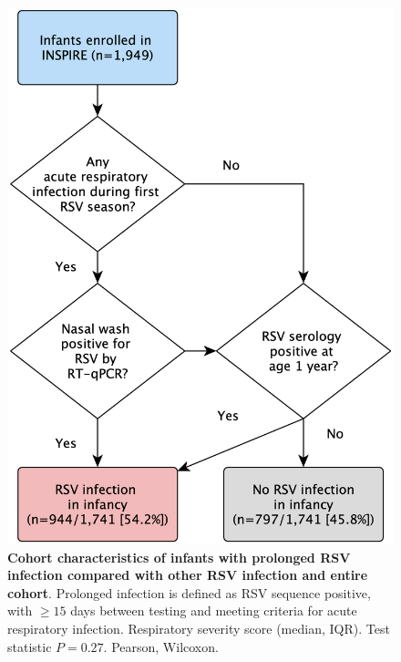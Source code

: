 \documentclass{article} %
\begin{document}
\begin{figure}[ht] \hspace*{0cm}  \begin{center}
    \includegraphics[scale=0.1]{f1_rsv_persist2022}
	\caption{\textbf{Cohort characteristics of infants with prolonged RSV infection compared with other RSV infection and entire cohort}. Prolonged infection is defined as RSV sequence positive, with $\ge 15$ days between testing and meeting criteria for acute respiratory infection. Respiratory severity score (median, IQR). Test statistic $P = 0.27$. Pearson, Wilcoxon.}
	\label{fig:1}
 \end{center} \end{figure}
 
\end{document}
